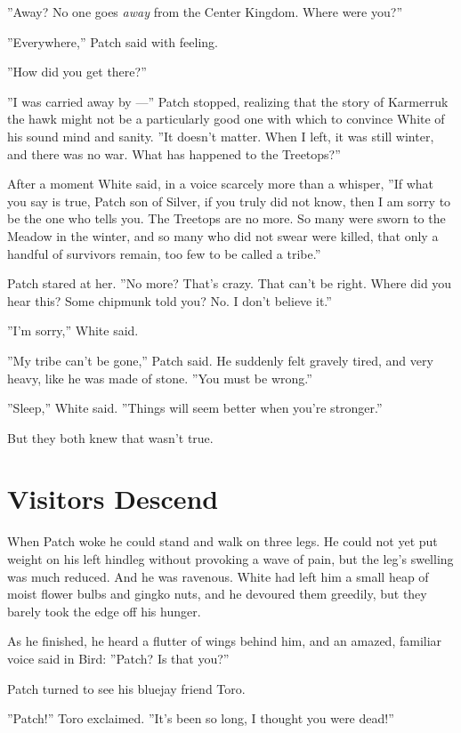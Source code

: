 \documentclass[12pt]{book}
\begin{document}
''Away? No one goes \textit{away} from the Center Kingdom. Where were
you?''

''Everywhere,'' Patch said with feeling.

''How did you get there?''

''I was carried away by ---'' Patch stopped, realizing that the story
of Karmerruk the hawk might not be a particularly good one with which
to convince White of his sound mind and sanity. ''It doesn't
matter. When I left, it was still winter, and there was no war. What
has happened to the Treetops?''

After a moment White said, in a voice scarcely more than a whisper,
''If what you say is true, Patch son of Silver, if you truly did not
know, then I am sorry to be the one who tells you. The Treetops are no
more. So many were sworn to the Meadow in the winter, and so many who
did not swear were killed, that only a handful of survivors remain,
too few to be called a tribe.''

Patch stared at her. ''No more? That's crazy. That can't be
right. Where did you hear this? Some chipmunk told you? No. I don't
believe it.''

''I'm sorry,'' White said.

''My tribe can't be gone,'' Patch said. He suddenly felt gravely
tired, and very heavy, like he was made of stone. ''You must be
wrong.''

''Sleep,'' White said. ''Things will seem better when you're
stronger.''

But they both knew that wasn't true.


\section{Visitors Descend}

When Patch woke he could stand and walk on three legs. He could not
yet put weight on his left hindleg without provoking a wave of pain,
but the leg's swelling was much reduced. And he was ravenous. White
had left him a small heap of moist flower bulbs and gingko nuts, and
he devoured them greedily, but they barely took the edge off his
hunger.

As he finished, he heard a flutter of wings behind him, and an amazed,
familiar voice said in Bird: ''Patch? Is that you?''

Patch turned to see his bluejay friend Toro.

''Patch!'' Toro exclaimed. ''It's been so long, I thought you were
dead!''
\end{document}
